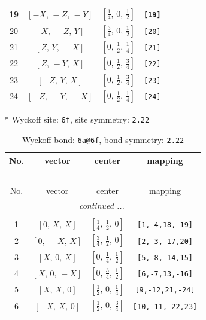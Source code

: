 \documentclass[fleqn,8pt]{jsarticle}
\begin{document}
\begin{longtable}{cccc}
19 & $\left[ - X,\, - Z,\, - Y \right]$ & $\left[ \frac{1}{4},\, 0,\, \frac{1}{2} \right]$ & {\tt [19]} \\ \hline
20 & $\left[ X,\, - Z,\, Y \right]$ & $\left[ \frac{3}{4},\, 0,\, \frac{1}{2} \right]$ & {\tt [20]} \\ \hline
21 & $\left[ Z,\, Y,\, - X \right]$ & $\left[ 0,\, \frac{1}{2},\, \frac{1}{4} \right]$ & {\tt [21]} \\ \hline
22 & $\left[ Z,\, - Y,\, X \right]$ & $\left[ 0,\, \frac{1}{2},\, \frac{3}{4} \right]$ & {\tt [22]} \\ \hline
23 & $\left[ - Z,\, Y,\, X \right]$ & $\left[ 0,\, \frac{1}{2},\, \frac{3}{4} \right]$ & {\tt [23]} \\ \hline
24 & $\left[ - Z,\, - Y,\, - X \right]$ & $\left[ 0,\, \frac{1}{2},\, \frac{1}{4} \right]$ & {\tt [24]} \\
\end{longtable}
* Wyckoff site: {\tt 6f}, site symmetry: {\tt 2.22}
\renewcommand{\arraystretch}{1.2}
\begin{longtable}{cccc}
\caption{Wyckoff bond: {\tt 6a@6f}, bond symmetry: {\tt 2.22}}
 \\
 \hline \hline
No. & vector & center & mapping \\ \hline \endfirsthead

\multicolumn{3}{l}{\tablename\ \thetable{}} \\
 \hline \hline
No. & vector & center & mapping \\ \hline \endhead

 \hline \hline
\multicolumn{3}{r}{\footnotesize\it continued ...} \\ \endfoot

 \hline \hline
\multicolumn{3}{r}{} \\ \endlastfoot

1 & $\left[ 0,\, X,\, X \right]$ & $\left[ \frac{1}{4},\, \frac{1}{2},\, 0 \right]$ & {\tt [1,-4,18,-19]} \\ \hline
2 & $\left[ 0,\, - X,\, X \right]$ & $\left[ \frac{3}{4},\, \frac{1}{2},\, 0 \right]$ & {\tt [2,-3,-17,20]} \\ \hline
3 & $\left[ X,\, 0,\, X \right]$ & $\left[ 0,\, \frac{1}{4},\, \frac{1}{2} \right]$ & {\tt [5,-8,-14,15]} \\ \hline
4 & $\left[ X,\, 0,\, - X \right]$ & $\left[ 0,\, \frac{3}{4},\, \frac{1}{2} \right]$ & {\tt [6,-7,13,-16]} \\ \hline
5 & $\left[ X,\, X,\, 0 \right]$ & $\left[ \frac{1}{2},\, 0,\, \frac{1}{4} \right]$ & {\tt [9,-12,21,-24]} \\ \hline
6 & $\left[ - X,\, X,\, 0 \right]$ & $\left[ \frac{1}{2},\, 0,\, \frac{3}{4} \right]$ & {\tt [10,-11,-22,23]} \\
\end{longtable}
\end{document}
